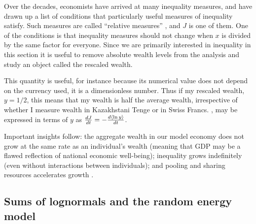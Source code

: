 Over the decades, economists have arrived at many inequality measures, and have drawn 
up a list of conditions that particularly useful measures of inequality satisfy. Such measures
are called ``relative measures'' \cite[Appendix 4]{Sen1997}, and $J$ is one of them. One of the conditions is that inequality measures
should not change when $x$ is divided by the same factor for everyone. Since we are primarily 
interested in inequality in this section it is useful to remove absolute wealth levels from the
analysis and study an object called the rescaled wealth.


This quantity is useful, for instance because its numerical value does not 
depend on the currency used, it is a dimensionless number. 
Thus if my rescaled wealth, $y=1/2$, this means that my wealth is half the 
average wealth, irrespective of whether I measure wealth in Kazakhstani Tenge 
or in Swiss Francs. , may be expressed in 
terms of $y$ as $\frac{dJ}{dt}=-\frac{d\left\langle\ln y \right\rangle}{dt}$. 


Important insights follow: the aggregate wealth in our model 
economy does not grow at the same rate as an individual's wealth \cite{AdamouPeters2016} (meaning that GDP may be a flawed reflection of national
economic well-being); inequality grows indefinitely \cite{BouchaudMezard2000,BermanPetersAdamou2017} (even without interactions between individuals); and 
pooling and sharing resources accelerates growth \cite{PetersAdamou2015a,Bouchaud2015}.


\subsection{Sums of lognormals and the random energy model}

